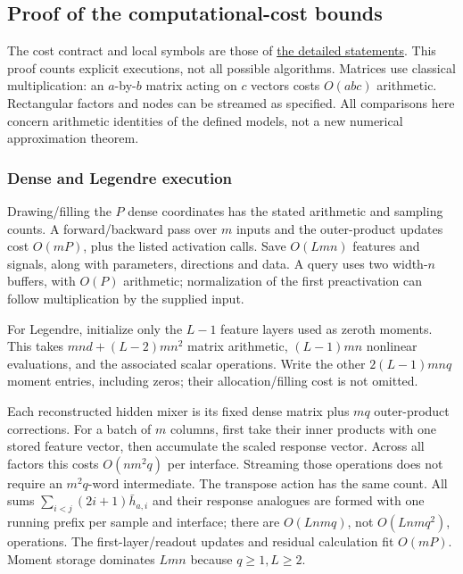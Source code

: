 \subsection{Proof of the computational-cost bounds}
\label{int:computational-cost-proofs}


The cost contract and local symbols are those of \hyperref[int:computational-costs]{the detailed statements}. This proof counts explicit executions, not all possible algorithms. Matrices use classical multiplication: an \(a\)-by-\(b\) matrix acting on \(c\) vectors costs \(O(abc)\) arithmetic. Rectangular factors and nodes can be streamed as specified. All comparisons here concern arithmetic identities of the defined models, not a new numerical approximation theorem.


\subsubsection{Dense and Legendre execution}



Drawing/filling the \(P\) dense coordinates has the stated arithmetic and sampling counts. A forward/backward pass over \(m\) inputs and the outer-product updates cost \(O(mP)\), plus the listed activation calls. Save \(O(Lmn)\) features and signals, along with parameters, directions and data. A query uses two width-\(n\) buffers, with \(O(P)\) arithmetic; normalization of the first preactivation can follow multiplication by the supplied input.



For Legendre, initialize only the \(L-1\) feature layers used as zeroth moments. This takes \(mnd+(L-2)mn^2\) matrix arithmetic, \((L-1)mn\) nonlinear evaluations, and the associated scalar operations. Write the other \(2(L-1)mnq\) moment entries, including zeros; their allocation/filling cost is not omitted.



Each reconstructed hidden mixer is its fixed dense matrix plus \(mq\) outer-product corrections. For a batch of \(m\) columns, first take their inner products with one stored feature vector, then accumulate the scaled response vector. Across all factors this costs \(O(nm^2q)\) per interface. Streaming those operations does not require an \(m^2q\)-word intermediate. The transpose action has the same count. All sums \(\sum_{i<j}(2i+1)\bar h_{a,\allowbreak i}\) and their response analogues are formed with one running prefix per sample and interface; there are \(O(Lnmq)\), not \(O(Lnmq^2)\), operations. The first-layer/readout updates and residual calculation fit \(O(mP)\). Moment storage dominates \(Lmn\) because \(q\ge1,\allowbreak L\ge2\).


